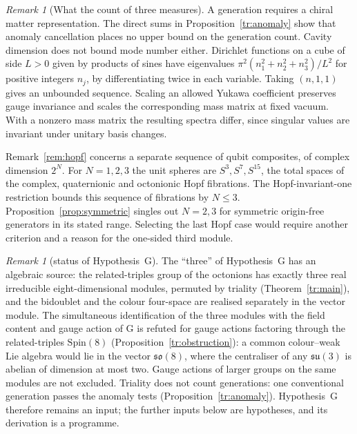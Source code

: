 \documentclass[aps,pra,onecolumn,superscriptaddress,nofootinbib,10pt]{revtex4-2}
\theoremstyle{definition}
\theoremstyle{remark}
\newtheorem{remark}[theorem]{Remark}
\begin{document}
\begin{remark}[What the count of three measures]\label{tr:multiplicity}
A generation requires a chiral matter representation. The direct
sums in Proposition~\ref{tr:anomaly} show that anomaly cancellation
places no upper bound on the generation count. Cavity dimension
does not bound mode number either. Dirichlet functions on a cube
of side \(L>0\) given by products of sines have eigenvalues
\(\pi^2(n_1^2+n_2^2+n_3^2)/L^2\) for positive integers \(n_j\),
by differentiating twice in each variable. Taking \((n,1,1)\)
gives an unbounded sequence. Scaling an allowed Yukawa coefficient
preserves gauge invariance and scales the corresponding mass
matrix at fixed vacuum. With a nonzero mass matrix the resulting
spectra differ, since singular values are invariant under unitary
basis changes.

Remark~\ref{rem:hopf} concerns a separate sequence of qubit
composites, of complex dimension \(2^N\). For \(N=1,2,3\)
the unit spheres are \(S^3,S^7,S^{15}\), the total spaces of
the complex, quaternionic and octonionic Hopf fibrations.
The Hopf-invariant-one restriction \cite{Adams} bounds this
sequence of fibrations by \(N\leq3\).
Proposition~\ref{prop:symmetric} singles out \(N=2,3\) for
symmetric origin-free generators in its stated range.
Selecting the last Hopf case would require another criterion
and a reason for the one-sided third module.
\end{remark}

\begin{remark}[status of Hypothesis~G]\label{rem:trstatus}
The ``three'' of Hypothesis~G has an algebraic source: the related-triples group of the octonions has exactly
three real irreducible eight-dimensional modules, permuted by triality (Theorem~\ref{tr:main}), and the
bidoublet and the colour four-space are realised separately in the vector module.  The simultaneous
identification of the three modules with the field content and gauge action of G is refuted for gauge actions
factoring through the related-triples $\mathrm{Spin}(8)$ (Proposition~\ref{tr:obstruction}): a common colour--weak Lie algebra
would lie in the vector $\mathfrak{so}(8)$, where the centraliser of any $\mathfrak{su}(3)$ is abelian of dimension at most two.
Gauge actions of larger groups on the same modules are not excluded.  Triality does not count generations:
one conventional generation passes the anomaly tests (Proposition~\ref{tr:anomaly}).  Hypothesis~G therefore
remains an input; the further inputs below are hypotheses, and its derivation is a programme.
\end{remark}
\end{document}
